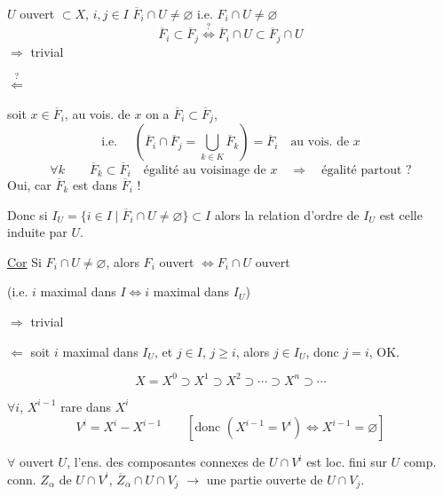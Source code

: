 $U$ ouvert $\subset X$, $i,j\in I$ \quad $\overline F_i\cap U\neq\varnothing$ i.e. $F_i\cap U\neq\varnothing$
\[
\overline F_i\subset\overline F_j
\overset{?}{\Longleftrightarrow}
\overline F_i\cap U\subset\overline F_j\cap U
\]
$\Rightarrow$ trivial

$\overset{?}{\Leftarrow}$


 soit $x\in\overline F_i$, au vois. de $x$ on a $\overline F_i\subset\overline F_j$,
\[
\text{i.e. }\quad
\left(\overline F_i\cap\overline F_j=\bigcup_{k\in K}\overline F_k\right)=\overline F_i
\quad\text{au vois. de }x
\]
\[
\forall k\qquad \overline F_k\subset\overline F_i
\quad\text{égalité au voisinage de }x
\quad\Longrightarrow\quad\text{égalité partout ?}
\]
Oui, car $\overline F_k$ est \uline{} dans $\overline F_i$ !

Donc si $I_U=\{i\in I\mid\overline F_i\cap U\neq\varnothing\}\subset I$
alors la relation d'ordre de $I_U$ est celle induite par $U$.

\uline{Cor} Si $F_i\cap U\neq\varnothing$, alors $F_i$ ouvert $\Longleftrightarrow F_i\cap U$ ouvert

(i.e. $i$ maximal dans $I\Longleftrightarrow i$ maximal dans $I_U$)


$\Rightarrow$ trivial

$\Leftarrow$ soit $i$ maximal dans $I_U$, et $j\in I$, $j\geq i$, alors $j\in I_U$, donc $j=i$, OK.

\[
X=X^0\supset X^1\supset X^2\supset\cdots\supset X^n\supset\cdots
\]

$\forall i$,  $X^{i-1}$ rare dans $X^i$
\[
V^i=X^i-X^{i-1}
\qquad
\left[\text{donc }(X^{i-1}=V^i)\Longleftrightarrow X^{i-1}=\varnothing\right]
\]

$\forall$ ouvert $U$, l'ens. des composantes connexes de $U\cap V^i$ est loc. fini sur $U$
 \deleted{$\unsure{\forall}$} comp. conn. $Z_\alpha$ de $U\cap V^i$,
 $\overline Z_\alpha\cap U\cap V_j$
$\longrightarrow$ une partie ouverte de $U\cap V_j$.

